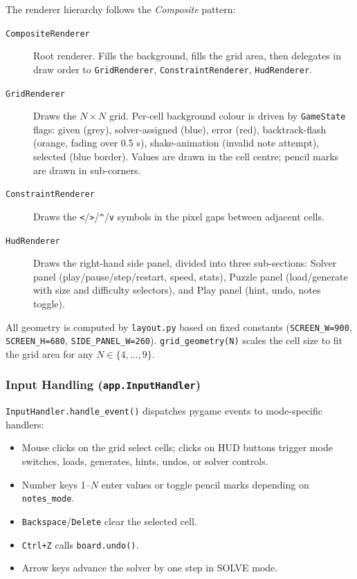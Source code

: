 The renderer hierarchy follows the \emph{Composite} pattern:

\begin{description}
  \item[\texttt{CompositeRenderer}] Root renderer.
    Fills the background, fills the grid area, then delegates in draw order
    to \texttt{GridRenderer}, \texttt{ConstraintRenderer}, \texttt{HudRenderer}.

  \item[\texttt{GridRenderer}] Draws the $N \times N$ grid.
    Per-cell background colour is driven by \texttt{GameState} flags:
    given (grey), solver-assigned (blue), error (red), backtrack-flash (orange,
    fading over 0.5 s), shake-animation (invalid note attempt), selected (blue
    border).
    Values are drawn in the cell centre; pencil marks are drawn in sub-corners.

  \item[\texttt{ConstraintRenderer}] Draws the \texttt{<}/\texttt{>}/\texttt{\^}/\texttt{v}
    symbols in the pixel gaps between adjacent cells.

  \item[\texttt{HudRenderer}] Draws the right-hand side panel, divided into
    three sub-sections: Solver panel (play/pause/step/restart, speed, stats),
    Puzzle panel (load/generate with size and difficulty selectors),
    and Play panel (hint, undo, notes toggle).
\end{description}

All geometry is computed by \texttt{layout.py} based on fixed constants
(\texttt{SCREEN\_W=900}, \texttt{SCREEN\_H=680},
\texttt{SIDE\_PANEL\_W=260}).
\texttt{grid\_geometry(N)} scales the cell size to fit the grid area for any
$N \in \{4, \ldots, 9\}$.

\subsubsection{Input Handling (\texttt{app.InputHandler})}

\texttt{InputHandler.handle\_event()} dispatches pygame events to mode-specific
handlers:
\begin{itemize}
  \item Mouse clicks on the grid select cells; clicks on HUD buttons trigger
        mode switches, loads, generates, hints, undos, or solver controls.
  \item Number keys 1–$N$ enter values or toggle pencil marks depending on
        \texttt{notes\_mode}.
  \item \texttt{Backspace}/\texttt{Delete} clear the selected cell.
  \item \texttt{Ctrl+Z} calls \texttt{board.undo()}.
  \item Arrow keys advance the solver by one step in SOLVE mode.
\end{itemize}

